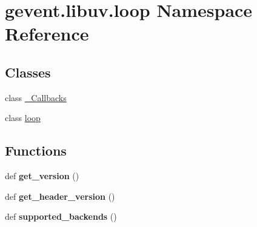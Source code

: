 \hypertarget{namespacegevent_1_1libuv_1_1loop}{}\section{gevent.\+libuv.\+loop Namespace Reference}
\label{namespacegevent_1_1libuv_1_1loop}
\subsection*{Classes}
\begin{DoxyCompactItemize}
\item 
class \hyperlink{classgevent_1_1libuv_1_1loop_1_1___callbacks}{\+\_\+\+Callbacks}
\item 
class \hyperlink{classgevent_1_1libuv_1_1loop_1_1loop}{loop}
\end{DoxyCompactItemize}
\subsection*{Functions}
\begin{DoxyCompactItemize}
\item 
\mbox{\label{namespacegevent_1_1libuv_1_1loop_aa0e1726d0dde172ffac74e8104330b34}} 
def {\bfseries get\+\_\+version} ()
\item 
\mbox{\label{namespacegevent_1_1libuv_1_1loop_a900dd144d6bf0c8f80a7ee0477b1ab95}} 
def {\bfseries get\+\_\+header\+\_\+version} ()
\item 
\mbox{\label{namespacegevent_1_1libuv_1_1loop_a35b0a93993c4377f7e047d787072a662}} 
def {\bfseries supported\+\_\+backends} ()
\end{DoxyCompactItemize}
